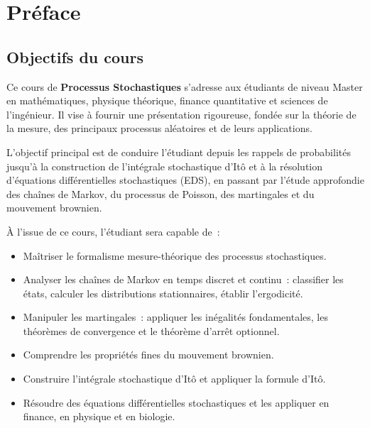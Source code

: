 \chapter*{Pr\'eface}

\section*{Objectifs du cours}

Ce cours de \textbf{Processus Stochastiques} s'adresse aux \'etudiants de niveau
Master en math\'ematiques, physique th\'eorique, finance quantitative et sciences
de l'ing\'enieur. Il vise \`a fournir une pr\'esentation rigoureuse, fond\'ee sur la
th\'eorie de la mesure, des principaux processus al\'eatoires et de leurs applications.

\medskip

L'objectif principal est de conduire l'\'etudiant depuis les rappels de probabilit\'es
jusqu'\`a la construction de l'int\'egrale stochastique d'It\^o et \`a la r\'esolution
d'\'equations diff\'erentielles stochastiques (EDS), en passant par l'\'etude approfondie
des cha\^ines de Markov, du processus de Poisson, des martingales et du mouvement
brownien.

\medskip

\`A l'issue de ce cours, l'\'etudiant sera capable de~:
\begin{itemize}
  \item Ma\^itriser le formalisme mesure-th\'eorique des processus stochastiques.
  \item Analyser les cha\^ines de Markov en temps discret et continu~: classifier
    les \'etats, calculer les distributions stationnaires, \'etablir l'ergodicit\'e.
  \item Manipuler les martingales~: appliquer les in\'egalit\'es fondamentales, les
    th\'eor\`emes de convergence et le th\'eor\`eme d'arr\^et optionnel.
  \item Comprendre les propri\'et\'es fines du mouvement brownien.
  \item Construire l'int\'egrale stochastique d'It\^o et appliquer la formule d'It\^o.
  \item R\'esoudre des \'equations diff\'erentielles stochastiques et les appliquer
    en finance, en physique et en biologie.
\end{itemize}

